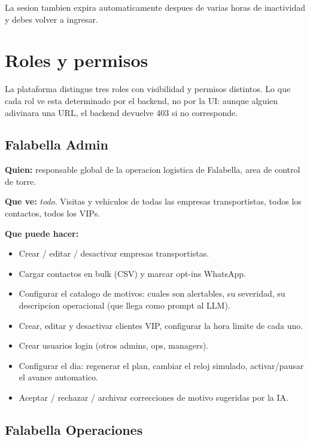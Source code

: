 \documentclass[11pt,a4paper]{article}
\begin{document}
La sesion tambien expira automaticamente despues de varias horas de
inactividad y debes volver a ingresar.

\section{Roles y permisos}

La plataforma distingue tres roles con visibilidad y permisos
distintos. Lo que cada rol ve esta determinado por el backend, no por
la UI: aunque alguien adivinara una URL, el backend devuelve 403 si no
corresponde.

\subsection{Falabella Admin}

\textbf{Quien:} responsable global de la operacion logistica de
Falabella, area de control de torre.

\textbf{Que ve:} \textit{todo}. Visitas y vehiculos de todas las
empresas transportistas, todos los contactos, todos los VIPs.

\textbf{Que puede hacer:}
\begin{itemize}
  \item Crear / editar / desactivar empresas transportistas.
  \item Cargar contactos en bulk (CSV) y marcar opt-ins WhatsApp.
  \item Configurar el catalogo de motivos: cuales son alertables, su
        severidad, su descripcion operacional (que llega como prompt
        al LLM).
  \item Crear, editar y desactivar clientes VIP, configurar la hora
        limite de cada uno.
  \item Crear usuarios login (otros admins, ops, managers).
  \item Configurar el dia: regenerar el plan, cambiar el reloj
        simulado, activar/pausar el avance automatico.
  \item Aceptar / rechazar / archivar correcciones de motivo
        sugeridas por la IA.
\end{itemize}

\subsection{Falabella Operaciones}
\end{document}
